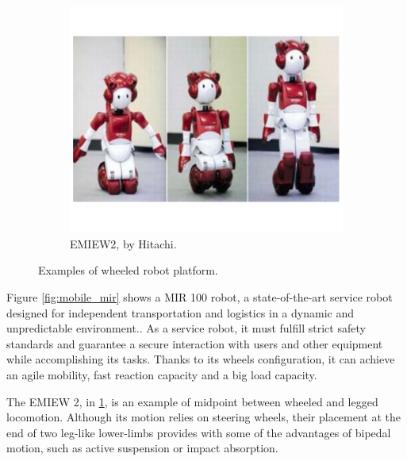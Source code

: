 \begin{figure}[htb]
\begin{subfigure}[t]{0.31\textwidth}
    \end{subfigure}
    \centering
    \begin{subfigure}[t]{0.31\textwidth}
        \includegraphics[width=\textwidth]{figures/mobile_hitachi}
        \caption{EMIEW2, by Hitachi.}
        \label{fig:mobile_hitachi}
    \end{subfigure}
    \caption{Examples of wheeled robot platform.}
    \label{fig:mobile_robots}
\end{figure}

Figure \ref{fig:mobile_mir} shows a MIR 100 robot, a state-of-the-art service robot designed for independent transportation and logistics in a dynamic and unpredictable environment..
As a service robot, it must fulfill strict safety standards and guarantee a secure interaction with users and other equipment while accomplishing its tasks.
Thanks to its wheels configuration, it can achieve an agile mobility, fast reaction capacity and a big load capacity.

\hfill

The EMIEW 2, in \ref{fig:mobile_hitachi}, is an example of midpoint between wheeled and legged locomotion.
Although its motion relies on steering wheels, their placement at the end of two leg-like lower-limbs provides with some of the advantages of bipedal motion, such as active suspension or impact absorption.



